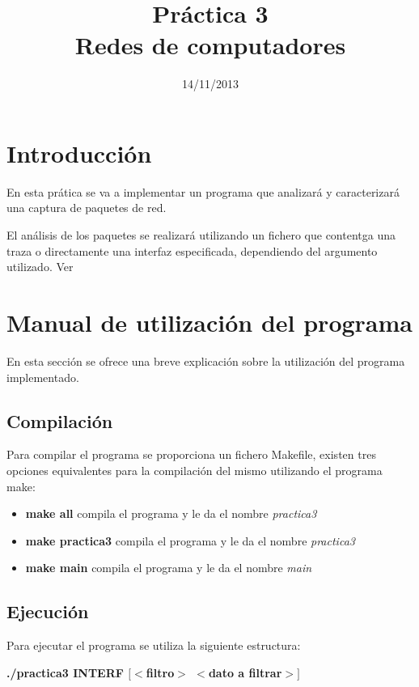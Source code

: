 \documentclass[a4paper, 11pt]{article}	%
\title{Práctica 3\\Redes de computadores}						%
\author{\enriquename \and \guillermoname}						%
\date{14/11/2013}												%
\begin{document}
\maketitle			%
\newpage				%
\tableofcontents		%
\newpage				%

\section{Introducción}	%
En esta prática se va a implementar un programa que analizará y caracterizará una captura de paquetes de red. 

El análisis de los paquetes se realizará utilizando un fichero que contentga una traza o directamente una interfaz especificada, dependiendo del argumento utilizado. Ver


\newpage
\appendix
\renewcommand\appendixname{Anexo}
\section{Manual de utilización del programa}
En esta sección se ofrece una breve explicación sobre la utilización del programa implementado.
\subsection{Compilación}
Para compilar el programa se proporciona un fichero Makefile, existen tres opciones equivalentes para la compilación del mismo utilizando el programa make:
\begin{itemize}
\item \textbf{make all} compila el programa y le da el nombre \textit{practica3}
\item \textbf{make practica3} compila el programa y le da el nombre \textit{practica3}
\item \textbf{make main} compila el programa y le da el nombre \textit{main}
\end{itemize}

\subsection{Ejecución}
Para ejecutar el programa se utiliza la siguiente estructura:

\begin{center}
\textbf{./practica3 INTERF $[<$filtro$>$ $<$dato a filtrar$>]$}
\end{center}
\end{document}
